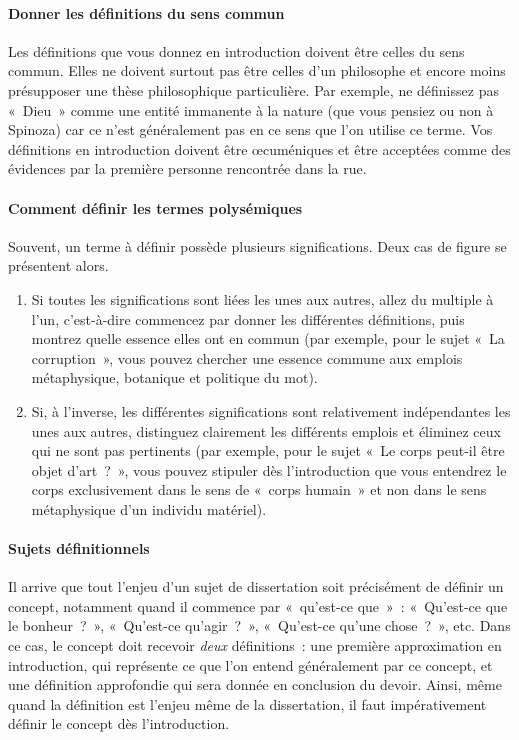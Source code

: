 \documentclass[a4paper,12pt]{article}
\begin{document}
\paragraph{Donner les définitions du sens commun}
\label{sec-2-2-1-3}

Les définitions que vous donnez en introduction doivent être celles du
sens commun. Elles ne doivent surtout pas être celles d'un philosophe et
encore moins présupposer une thèse philosophique particulière. Par
exemple, ne définissez pas « Dieu » comme une entité immanente à la nature
(que vous pensiez ou non à Spinoza) car ce n'est généralement pas en ce
sens que l'on utilise ce terme. Vos définitions en introduction doivent
être œcuméniques et être acceptées comme des évidences par la première
personne rencontrée dans la rue.

\paragraph{Comment définir les termes polysémiques}
\label{sec-2-2-1-4}

Souvent, un terme à définir possède plusieurs significations. Deux cas
de figure se présentent alors. 

\begin{enumerate}
\item Si toutes les significations sont liées les unes aux autres, allez du
multiple à l'un, c'est-à-dire commencez par donner les différentes
définitions, puis montrez quelle essence elles ont en commun (par
exemple, pour le sujet « La corruption », vous pouvez chercher une
essence commune aux emplois métaphysique, botanique et politique du
mot).
\item Si, à l'inverse, les différentes significations sont relativement
indépendantes les unes aux autres, distinguez clairement les
différents emplois et éliminez ceux qui ne sont pas pertinents (par
exemple, pour le sujet « Le corps peut-il être objet d'art ? », vous
pouvez stipuler dès l'introduction que vous entendrez le corps
exclusivement dans le sens de « corps humain » et non dans le sens
métaphysique d'un individu matériel).
\end{enumerate}

\paragraph{Sujets définitionnels}
\label{sec-2-2-1-5}

Il arrive que tout l'enjeu d'un sujet de dissertation soit précisément
de définir un concept, notamment quand il commence par « qu'est-ce que » :
« Qu'est-ce que le bonheur ? », « Qu'est-ce qu'agir ? », « Qu'est-ce qu'une
chose ? », etc. Dans ce cas, le concept doit recevoir \emph{deux}
définitions : une première approximation en introduction, qui représente
ce que l'on entend généralement par ce concept, et une définition
approfondie qui sera donnée en conclusion du devoir. Ainsi, même quand
la définition est l'enjeu même de la dissertation, il faut
impérativement définir le concept dès l'introduction.
\end{document}
